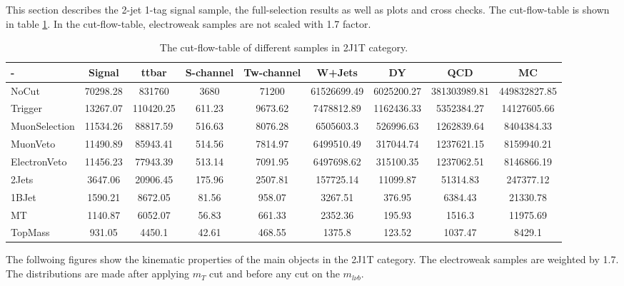 This section describes the 2-jet 1-tag signal sample, the full-selection results as well as plots and cross checks.
The cut-flow-table is shown in table \ref{tbl:2J1Tcft}. In the cut-flow-table, electroweak samples are not scaled with 1.7 
factor.


\begin{table}[!Hhtb]
\begin{scriptsize}
\begin{tabular}{|l|c|c|c|c|c|c|c|c|}\hline
- & Signal & ttbar & S-channel & Tw-channel & W+Jets & DY & QCD & MC\\\hline
NoCut & 70298.28 & 831760 & 3680 & 71200 & 61526699.49 & 6025200.27 & 381303989.81 & 449832827.85\\
Trigger & 13267.07 & 110420.25 & 611.23 & 9673.62 & 7478812.89 & 1162436.33 & 5352384.27 & 14127605.66\\
MuonSelection & 11534.26 & 88817.59 & 516.63 & 8076.28 & 6505603.3 & 526996.63 & 1262839.64 & 8404384.33\\
MuonVeto & 11490.89 & 85943.41 & 514.56 & 7814.97 & 6499510.49 & 317044.74 & 1237621.15 & 8159940.21\\
ElectronVeto & 11456.23 & 77943.39 & 513.14 & 7091.95 & 6497698.62 & 315100.35 & 1237062.51 & 8146866.19\\
2Jets & 3647.06 & 20906.45 & 175.96 & 2507.81 & 157725.14 & 11099.87 & 51314.83 & 247377.12\\
1BJet & 1590.21 & 8672.05 & 81.56 & 958.07 & 3267.51 & 376.95 & 6384.43 & 21330.78\\
MT & 1140.87 & 6052.07 & 56.83 & 661.33 & 2352.36 & 195.93 & 1516.3 & 11975.69\\
TopMass & 931.05 & 4450.1 & 42.61 & 468.55 & 1375.8 & 123.52 & 1037.47 & 8429.1\\\hline
\end{tabular}
\caption{The cut-flow-table of different samples in 2J1T category.}
\label{tbl:2J1Tcft}
\end{scriptsize}
\end{table}


The follwoing figures show the kinematic properties of the main objects in the 2J1T category. The electroweak samples are 
weighted by 1.7. The distributions are made after applying $m_T$ cut and before any cut on the $m_{l\nu b}$.










